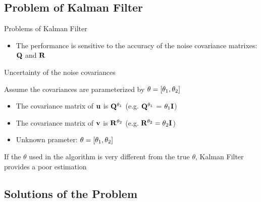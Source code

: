 \subsection{Problem of Kalman Filter}

\begin{frame}{Problems of Kalman Filter}
\begin{itemize}
    \item The performance is sensitive to the accuracy of the noise covariance matrixes: ${\bf Q}$ and ${\bf R}$  \cite{Sangsuk-Iam1990}
\end{itemize}
\end{frame}

\begin{frame}{Uncertainty of the noise covariances}

Assume the covariances are parameterized by ${\bf \theta}=[\theta_1, \theta_2]$

\begin{itemize}
    \item The covariance matrix of ${\bf u}$ is  ${\bf Q}^{\theta_1}$ (e.g. ${\bf Q}^{\theta_1}$ = $\theta_1{\bf I}$)
    \item The covariance matrix of ${\bf v}$ is ${\bf R}^{\theta_2}$ (e.g. ${\bf R}^{\theta_2}=\theta_2{\bf I}$)
    \item Unknown prameter: ${\bf \theta}=[\theta_1, \theta_2]$
\end{itemize}

If the $\theta$ used in the algorithm is very different from the true $\theta$, Kalman Filter provides a poor estimation
\end{frame}

\subsection{Solutions of the Problem}

